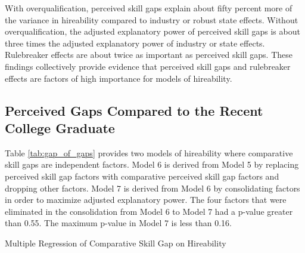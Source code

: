 \documentclass[review]{elsarticle}
\begin{document}
With overqualification, perceived skill gaps explain about fifty percent more of the variance in hireability compared to industry or robust state effects.
Without overqualification, the adjusted explanatory power of perceived skill gaps is about three times the adjusted explanatory power of industry or state effects.
Rulebreaker effects are about twice as important as perceived skill gaps.
These findings collectively provide evidence that perceived skill gaps and rulebreaker effects are factors of high importance for models of hireability.

\subsection{Perceived Gaps Compared to the Recent College Graduate}

Table \ref{tab:gap_of_gaps} provides two models of hireability where comparative skill gaps are independent factors.
Model 6 is derived from Model 5 by replacing perceived skill gap factors with comparative perceived skill gap factors and dropping other factors.
Model 7 is derived from Model 6 by consolidating factors in order to maximize adjusted explanatory power.
The four factors that were eliminated in the consolidation from Model 6 to Model 7 had a p-value greater than 0.55.
The maximum p-value in Model 7 is less than 0.16.

\begin{table}
    \caption{Multiple Regression of Comparative Skill Gap on Hireability}
    \resizebox{\columnwidth}{!}{
        
    }
    \label{tab:gap_of_gaps}
\end{table}
\end{document}

